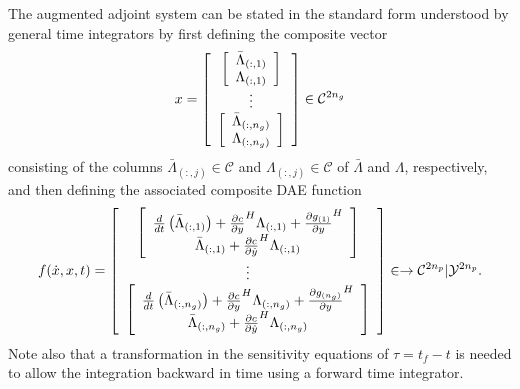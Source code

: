 \documentclass[pdf,ps2pdf,11pt]{SANDreport}
\begin{document}
The augmented adjoint system can be stated in the standard form understood by
general time integrators by first defining the composite vector
%
\begin{equation}
x =
{\bmat{c}
{\bmat{c} \bar{\Lambda}_{(:,1)} \\ \Lambda_{(:,1)} \emat} \\
\vdots \\
{\bmat{c} \bar{\Lambda}_{(:,n_g)} \\ \Lambda_{(:,n_g)} \emat} \\
\emat}
\in \mathcal{C}^{2 n_g}
\end{equation}
%
consisting of the columns $\bar{\Lambda}_{(:,j)}\in\mathcal{C}$ and
$\Lambda_{(:,j)}\in\mathcal{C}$ of $\bar{\Lambda}$ and $\Lambda$,
respectively, and then defining the associated composite DAE function
%
\begin{equation}
f(\dot{x},x,t) =
{\bmat{c}
%
{\bmat{c}
\frac{d}{dt}\left( \bar{\Lambda}_{(:,1)} \right)
+ \frac{\partial c}{\partial y}^H \Lambda_{(:,1)} + \frac{\partial g_{(1)}}{\partial y}^H
\\
\bar{\Lambda}_{(:,1)} + \frac{\partial c}{\partial \dot{y}}^H \Lambda_{(:,1)}
\emat} \\
%
\vdots \\
%
{\bmat{c}
\frac{d}{dt}\left( \bar{\Lambda}_{(:,n_g)} \right)
+ \frac{\partial c}{\partial y}^H \Lambda_{(:,n_g)} + \frac{\partial g_{(n_g)}}{\partial y}^H
\\
\bar{\Lambda}_{(:,n_g)} + \frac{\partial c}{\partial \dot{y}}^H \Lambda_{(:,n_g)}
\emat} \\
%
\emat}
\in \rightarrow \mathcal{C}^{2 n_p}|\mathcal{Y}^{2 n_p}.
\label{rythmos:eqn:aug-adj-sens-daes}
\end{equation}
%
Note also that a transformation in the sensitivity equations of $\tau = t_f -
t$ is needed to allow the integration backward in time using a forward time
integrator.
\end{document}
